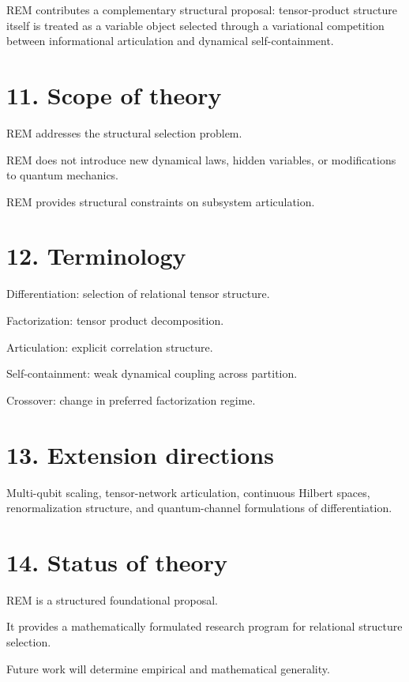 \documentclass[]{article}
\begin{document}
REM contributes a complementary structural proposal: tensor-product structure itself is treated as a variable object selected through a variational competition between informational articulation and dynamical self-containment.

\section{11. Scope of theory}
REM addresses the structural selection problem.

REM does not introduce new dynamical laws, hidden variables, or modifications to quantum mechanics.

REM provides structural constraints on subsystem articulation.

\section{12. Terminology}
Differentiation: selection of relational tensor structure.

Factorization: tensor product decomposition.

Articulation: explicit correlation structure.

Self-containment: weak dynamical coupling across partition.

Crossover: change in preferred factorization regime.

\section{13. Extension directions}
Multi-qubit scaling, tensor-network articulation, continuous Hilbert spaces, renormalization structure, and quantum-channel formulations of differentiation.

\section{14. Status of theory}
REM is a structured foundational proposal.

It provides a mathematically formulated research program for relational structure selection.

Future work will determine empirical and mathematical generality.
\end{document}

